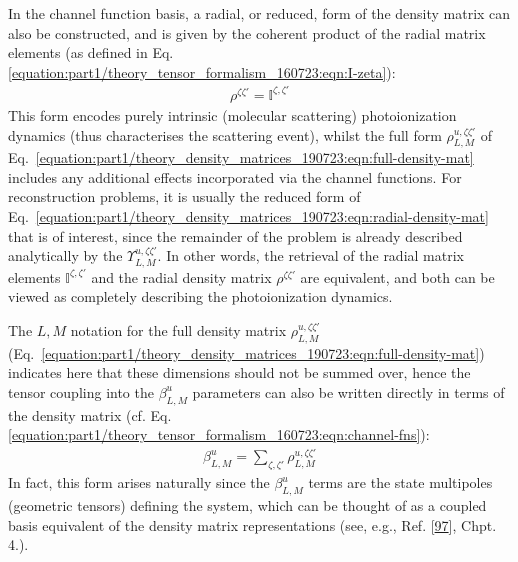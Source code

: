 \documentclass[letterpaper,table,10pt,english]{jupyterBook}
\begin{document}
\sphinxAtStartPar
In the channel function basis, a radial, or reduced, form of the density matrix can also be constructed, and is given by the coherent product of the radial matrix elements (as defined in Eq. \eqref{equation:part1/theory_tensor_formalism_160723:eqn:I-zeta}):
\begin{equation}\label{equation:part1/theory_density_matrices_190723:eqn:radial-density-mat}
\begin{split}
\rho^{\zeta\zeta'} = \mathbb{I}^{\zeta,\zeta'}
\end{split}
\end{equation}
\sphinxAtStartPar
This form encodes purely intrinsic (molecular scattering) photoionization dynamics (thus characterises the scattering event), whilst the full form \({\rho}_{L,M}^{u,\zeta\zeta'}\) of Eq. \eqref{equation:part1/theory_density_matrices_190723:eqn:full-density-mat} includes any additional effects incorporated via the channel functions. For reconstruction problems, it is usually the reduced form of Eq. \eqref{equation:part1/theory_density_matrices_190723:eqn:radial-density-mat} that is of interest, since the remainder of the problem is already described analytically by the {\hyperref[\detokenize{backmatter/glossary:term-channel-functions}]{}} \(\varUpsilon_{L,M}^{u,\zeta\zeta'}\). In other words, the retrieval of the radial matrix elements \(\mathbb{I}^{\zeta,\zeta'}\) and the radial density matrix \(\rho^{\zeta\zeta'}\) are equivalent, and both can be viewed as completely describing the photoionization dynamics.

\sphinxAtStartPar
The \(L,M\) notation for the full density matrix \({\rho}_{L,M}^{u,\zeta\zeta'}\) (Eq. \eqref{equation:part1/theory_density_matrices_190723:eqn:full-density-mat}) indicates here that these dimensions should not be summed over, hence the tensor coupling into the \(\beta_{L,M}^{u}\) parameters can also be written directly in terms of the density matrix (cf. Eq. \eqref{equation:part1/theory_tensor_formalism_160723:eqn:channel-fns}):
\begin{equation}\label{equation:part1/theory_density_matrices_190723:eqn:beta-density-mat}
\begin{split}
\beta_{L,M}^{u}=\sum_{\zeta,\zeta'}{\rho}_{L,M}^{u,\zeta\zeta'}
\end{split}
\end{equation}
\sphinxAtStartPar
In fact, this form arises naturally since the \(\beta_{L,M}^{u}\) terms are the state multipoles (geometric tensors) defining the system, which can be thought of as a coupled basis equivalent of the density matrix representations (see, e.g., Ref. {[}\hyperlink{cite.backmatter/bibliography:id534}{97}{]}, Chpt. 4.).
\end{document}

